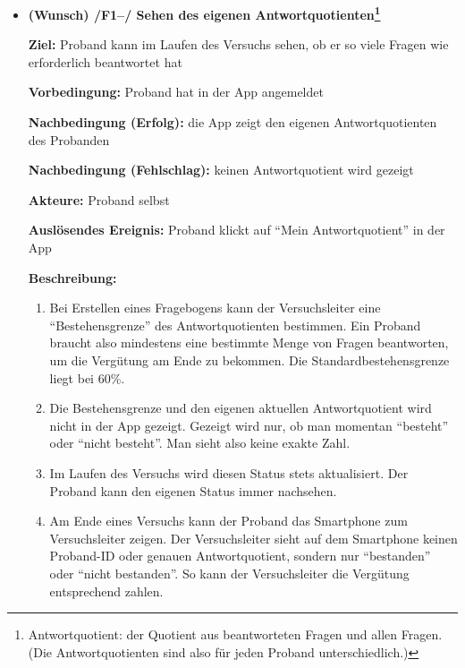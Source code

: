 \documentclass[a4paper]{scrreprt}
\begin{document}
\begin{itemize}
            \item \textbf{(Wunsch) /F1--/ Sehen des eigenen Antwortquotienten\footnote{Antwortquotient: der Quotient aus beantworteten Fragen und allen Fragen. (Die Antwortquotienten sind also für jeden Proband unterschiedlich.)}}

            \par \textbf{Ziel: }Proband kann im Laufen des Versuchs sehen, ob er so viele Fragen wie erforderlich beantwortet hat
            \par \textbf{Vorbedingung: }Proband hat in der App angemeldet
            \par \textbf{Nachbedingung (Erfolg): }die App zeigt den eigenen Antwortquotienten des Probanden
            \par \textbf{Nachbedingung (Fehlschlag): }keinen Antwortquotient wird gezeigt
            \par \textbf{Akteure: }Proband selbst
            \par \textbf{Auslösendes Ereignis: }Proband klickt auf “Mein Antwortquotient” in der App
            \par \textbf{Beschreibung: }
                \begin{enumerate}
                    \item Bei Erstellen eines Fragebogens kann der Versuchsleiter eine “Bestehensgrenze” des Antwortquotienten bestimmen. Ein Proband braucht also mindestens eine bestimmte Menge von Fragen beantworten, um die Vergütung am Ende zu bekommen. Die Standardbestehensgrenze liegt bei 60\%.
                    \item Die Bestehensgrenze und den eigenen aktuellen Antwortquotient wird nicht in der App gezeigt. Gezeigt wird nur, ob man momentan “besteht” oder “nicht besteht”. Man sieht also keine exakte Zahl.
                    \item Im Laufen des Versuchs wird diesen Status stets aktualisiert. Der Proband kann den eigenen Status immer nachsehen.
                    \item Am Ende eines Versuchs kann der Proband das Smartphone zum Versuchsleiter zeigen. Der Versuchsleiter sieht auf dem Smartphone keinen Proband-ID oder genauen Antwortquotient, sondern nur “bestanden” oder “nicht bestanden”. So kann der Versuchsleiter die Vergütung entsprechend zahlen.
                \end{enumerate}

        \end{itemize}
\end{document}
